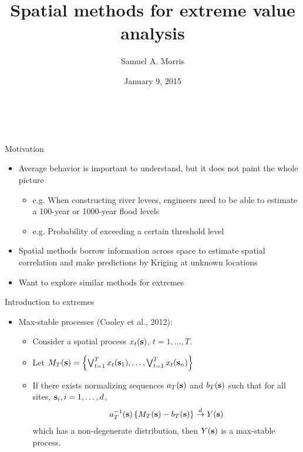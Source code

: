 \documentclass{beamer}
\title[Spatial methods for extreme value analysis] %
{
  Spatial methods for extreme value analysis
}
\author[Samuel A. Morris]{Samuel A. Morris}
\institute[NCSU]{}
\date{January 9, 2015}
\begin{document}
\begin{frame}\frametitle{\ }
\begin{center}
  \maketitle
\end{center}
\end{frame}

\begin{frame}{Motivation}
  \begin{itemize} \setlength{\itemsep}{1em}
    \item Average behavior is important to understand, but it does not paint the whole picture
    \begin{itemize}
      \item e.g. When constructing river levees, engineers need to be able to estimate a 100-year or 1000-year flood levels
      \item e.g. Probability of exceeding a certain threshold level
    \end{itemize}
    \item Spatial methods borrow information across space to estimate spatial correlation and make predictions by Kriging at unknown locations
    \item Want to explore similar methods for extremes
  \end{itemize}
\end{frame}

\begin{frame}{Introduction to extremes}
  \begin{itemize} \setlength{\itemsep}{0.5em}
    \item Max-stable processes (Cooley et al., 2012):
    \begin{itemize}
      \item Consider a spatial process $x_t(\mbox{\bf s})$, $t = 1, \ldots, T$.
      \item Let $M_T(\mbox{\bf s}) = \left\{ \bigvee_{t=1}^T x_t(\mbox{\bf s}_1), \ldots, \bigvee_{t=1}^T x_t(\mbox{\bf s}_n) \right\}$
      \item If there exists normalizing sequences $a_T(\mbox{\bf s})$ and $b_T(\mbox{\bf s})$ such
      that for all sites, $\mbox{\bf s}_i, i = 1, \ldots, d$,
      \begin{align*}
        a_T^{-1}(\mbox{\bf s}) \left\{ M_T(\mbox{\bf s}) - b_T(\mbox{\bf s}) \right\} \stackrel{d}{\rightarrow} Y(\mbox{\bf s})
      \end{align*}
      which has a non-degenerate distribution, then $Y(\mbox{\bf s})$ is a max-stable process.
    \end{itemize}
  \end{itemize}
\end{frame}
\end{document}
